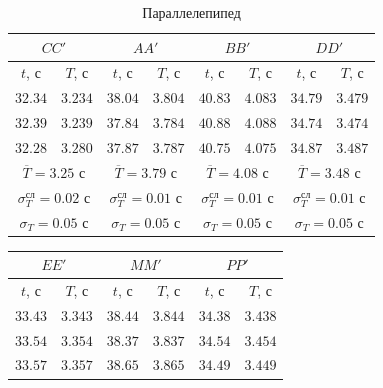 \documentclass[a4paper,12pt]{article}
\begin{document}
\begin{enumerate}
    \begin{table}[!h]
        \centering
        \begin{tabular}{|c|c|c|c|c|c|c|c|} \hline
            \multicolumn{2}{|c}{$CC'$}  & \multicolumn{2}{|c}{$AA'$}  & \multicolumn{2}{|c}{$BB'$} & \multicolumn{2}{|c|}{$DD'$} \\ \hline
            $t$, с  & $T$, с  & $t$, с  & $T$, с  & $t$, с  & $T$, с  & $t$, с  & $T$, с  \\ \hline
            $32.34$ & $3.234$ & $38.04$ & $3.804$ & $40.83$ & $4.083$ & $34.79$ & $3.479$ \\ \hline
            $32.39$ & $3.239$ & $37.84$ & $3.784$ & $40.88$ & $4.088$ & $34.74$ & $3.474$ \\ \hline
            $32.28$ & $3.280$ & $37.87$ & $3.787$ & $40.75$ & $4.075$ & $34.87$ & $3.487$ \\ \hline
            \multicolumn{2}{|c|}{$\overline{T} = 3.25$ с} & \multicolumn{2}{|c|}{$\overline{T} = 3.79$ с} & \multicolumn{2}{|c|}{$\overline{T} = 4.08$ с} & \multicolumn{2}{|c|}{$\overline{T} = 3.48$ с} \\ 
            \multicolumn{2}{|c|}{$\sigma_T^{\text{сл}} = 0.02$ с} & \multicolumn{2}{|c|}{$\sigma_T^{\text{сл}} = 0.01$ с} & \multicolumn{2}{|c|}{$\sigma_T^{\text{сл}} = 0.01$ с} & \multicolumn{2}{|c|}{$\sigma_T^{\text{сл}} = 0.01$ с} \\ 
            \multicolumn{2}{|c|}{$\sigma_T = 0.05$ с} & \multicolumn{2}{|c|}{$\sigma_T = 0.05$ с} & \multicolumn{2}{|c|}{$\sigma_T = 0.05$ с} & \multicolumn{2}{|c|}{$\sigma_T = 0.05$ с} \\ \hline
        \end{tabular}
        \caption{Параллелепипед}
    \end{table}
    \begin{table}[!h]
        \centering
        \begin{tabular}{|c|c|c|c|c|c|} \hline
            \multicolumn{2}{|c}{$EE'$} & \multicolumn{2}{|c}{$MM'$} & \multicolumn{2}{|c|}{$PP'$} \\ \hline
            $t$, с  & $T$, с  & $t$, с  & $T$, с  & $t$, с  & $T$, с  \\ \hline
            $33.43$ & $3.343$ & $38.44$ & $3.844$ & $34.38$ & $3.438$ \\ \hline
            $33.54$ & $3.354$ & $38.37$ & $3.837$ & $34.54$ & $3.454$ \\ \hline
            $33.57$ & $3.357$ & $38.65$ & $3.865$ & $34.49$ & $3.449$ \\ \hline

\end{tabular}
\end{table}
\end{enumerate}
\end{document}
